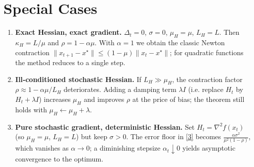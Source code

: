\documentclass{article}
\begin{document}
\section*{Special Cases}
\begin{enumerate}
\item \textbf{Exact Hessian, exact gradient.} $\Delta_t=0$, $\sigma=0$, $\mu_H=\mu$, $L_H=L$.  
Then $\kappa_H=L/\mu$ and $\rho=1-\alpha\mu$. With $\alpha=1$ we obtain the classic Newton contraction $\|x_{t+1}-x^{\star}\|\le (1-\mu)\|x_t-x^{\star}\|$; for quadratic functions the method reduces to a single step.

\item \textbf{Ill‑conditioned stochastic Hessian.} If $L_H\gg\mu_H$, the contraction factor $\rho\approx1-\alpha\mu/\!L_H$ deteriorates. Adding a damping term $\lambda I$ (i.e. replace $H_t$ by $H_t+\lambda I$) increases $\mu_H$ and improves $\rho$ at the price of bias; the theorem still holds with $\mu_H\gets\mu_H+\lambda$.

\item \textbf{Pure stochastic gradient, deterministic Hessian.} Set $H_t=\nabla^{2}f(x_t)$ (so $\mu_H=\mu$, $L_H=L$) but keep $\sigma>0$. The error floor in \eqref{3} becomes $\frac{\alpha\sigma^{2}}{\mu^{2}(1-\rho)}$, which vanishes as $\alpha\to0$; a diminishing stepsize $\alpha_t\downarrow0$ yields asymptotic convergence to the optimum.
\end{enumerate}
\end{document}
